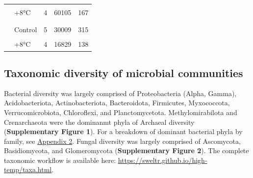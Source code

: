 \documentclass[
  10pt,
  letterpaper,
  DIV=11,
  numbers=noendperiod]{scrartcl}
\begin{document}
\begin{table}[H]
\begin{tabular}[t]{llccc}
\hspace{1em}\cellcolor{gray!6}{} & \cellcolor{gray!6}{+3°C} & \cellcolor{gray!6}{4} & \cellcolor{gray!6}{92836} & \cellcolor{gray!6}{257}\\
\hspace{1em} & +8°C & 4 & 60105 & 167\\
\addlinespace[-0.3em]
\multicolumn{5}{l}{\textbf{}}\\
\hspace{1em}\cellcolor{gray!6}{PIME filter} & \cellcolor{gray!6}{} & \cellcolor{gray!6}{13} & \cellcolor{gray!6}{67665} & \cellcolor{gray!6}{474}\\
\hspace{1em} & Control & 5 & 30009 & 315\\
\hspace{1em}\cellcolor{gray!6}{} & \cellcolor{gray!6}{+3°C} & \cellcolor{gray!6}{4} & \cellcolor{gray!6}{20827} & \cellcolor{gray!6}{234}\\
\hspace{1em} & +8°C & 4 & 16829 & 138\\
\bottomrule
\end{tabular}
\end{table}

\hypertarget{taxonomic-diversity-of-microbial-communities}{%
\subsection{Taxonomic diversity of microbial
communities}\label{taxonomic-diversity-of-microbial-communities}}

Bacterial diversity was largely comprised of Proteobacteria (Alpha,
Gamma), Acidobacteriota, Actinobacteriota, Bacteroidota, Firmicutes,
Myxococcota, Verrucomicrobiota, Chloroflexi, and Planctomycetota.
Methylomirabilota and Crenarchaeota were the dominanmt phyla of Archaeal
diversity (\textbf{Supplementary Figure 1}). For a breakdown of dominant
bacterial phyla by family, see
\hyperref[appendix-2]{\color{blue}Appendix 2}. Fungal diversity was
largely comprised of Ascomycota, Basidiomycota, and Glomeromycota
(\textbf{Supplementary Figure 2}). The complete taxonomic workflow is
available here: \url{https://sweltr.github.io/high-temp/taxa.html}.
\end{document}
